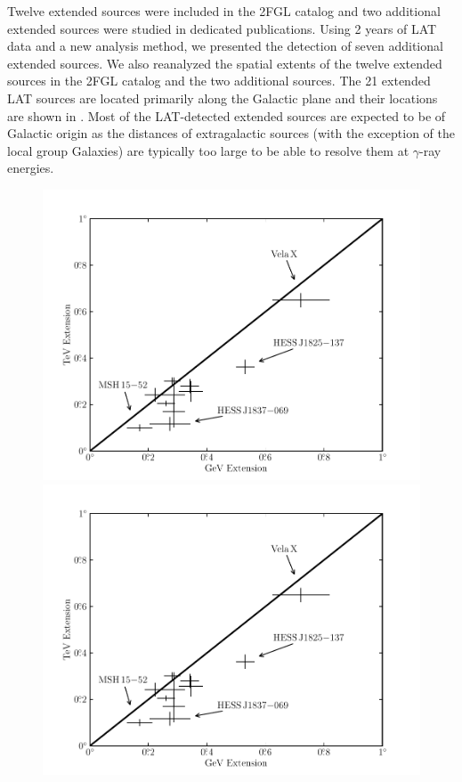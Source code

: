 Twelve extended sources were included in the 2FGL catalog and two additional extended
sources were studied in dedicated publications.  Using 2 years of
LAT data and a new analysis method, we presented the detection of seven
additional extended sources.  We also reanalyzed the spatial extents of the
twelve extended sources in the 2FGL catalog and the two additional sources.  The 21
extended LAT sources are located primarily along the Galactic plane
and their locations are shown in .
Most of the LAT-detected extended sources are expected to be of Galactic
origin as the distances of extragalactic sources (with the exception of
the local group Galaxies) are typically too large to be able to resolve
them at $\gamma$-ray energies.


\begin{figure}[htbp]
    \ifcolorfigure
      \includegraphics{chapters/extended_search/figures/summary_plots/gev_vs_tev_plot_color.pdf}
    \else
      \includegraphics{chapters/extended_search/figures/summary_plots/gev_vs_tev_plot_bw.pdf}

\end{figure}
